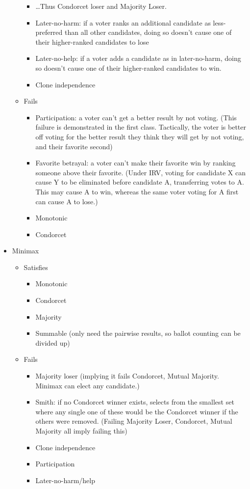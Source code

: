 \begin{itemize}
\begin{itemize}
\begin{itemize}
            \item …Thus Condorcet loser and Majority Loser.
            \item Later-no-harm:  if a voter ranks an additional candidate as less-preferred than all other candidates, doing so doesn't cause one of their higher-ranked candidates to lose
            \item Later-no-help:  if a voter adds a candidate as in later-no-harm, doing so doesn't cause one of their higher-ranked candidates to win.
            \item Clone independence
        \end{itemize}
        \item Fails
        \begin{itemize}
            \item Participation:  a voter can't get a better result by not voting.  (This failure is demonstrated in the first class.  Tactically, the voter is better off voting for the better result they think they will get by not voting, and their favorite second)
            \item Favorite betrayal:  a voter can't make their favorite win by ranking someone above their favorite.  (Under IRV, voting for candidate X can cause Y to be eliminated before candidate A, transferring votes to A.  This may cause A to win, whereas the same voter voting for A first can cause A to lose.)
            \item Monotonic
            \item Condorcet
        \end{itemize}
    \end{itemize}
    \item Minimax
    \begin{itemize}
        \item Satisfies
        \begin{itemize}
            \item Monotonic
            \item Condorcet
            \item Majority
            \item Summable (only need the pairwise results, so ballot counting can be divided up)
        \end{itemize}
        \item Fails
        \begin{itemize}
            \item Majority loser (implying it fails Condorcet, Mutual Majority.  Minimax can elect any candidate.)
            \item Smith:  if no Condorcet winner exists, selects from the smallest set where any single one of these would be the Condorcet winner if the others were removed.  (Failing Majority Loser, Condorcet, Mutual Majority all imply failing this)
            \item Clone independence
            \item Participation
            \item Later-no-harm/help
        \end{itemize}
    \end{itemize}


\end{itemize}
